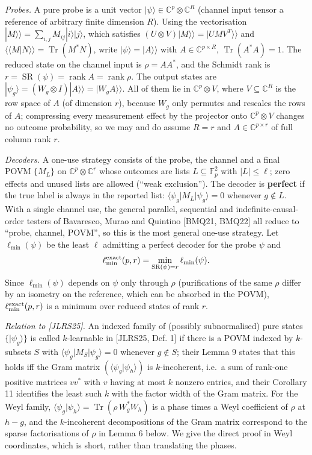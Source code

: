 \documentclass[
  11pt,
  a4paper,
]{article}
\begin{document}
\emph{Probes.} A pure probe is a unit vector
\(|\psi\rangle\in\mathbb C^p\otimes\mathbb C^R\) (channel input tensor a
reference of arbitrary finite dimension \(R\)). Using the vectorisation
\(|M\rangle\!\rangle=\sum_{i,\allowbreak{}j}M_{ij}|i\rangle|j\rangle\), which
satisfies \((U\otimes V)|M\rangle\!\rangle=|UMV^{T}\rangle\!\rangle\)
and \(\langle\!\langle M|N\rangle\!\rangle=\operatorname{Tr}(M^*N)\),
write \(|\psi\rangle=|A\rangle\!\rangle\) with
\(A\in\mathbb C^{p\times R}\), \(\operatorname{Tr}(A^*A)=1\). The
reduced state on the channel input is \(\rho=AA^*\), and the Schmidt
rank is
\(r=\operatorname{SR}(\psi)=\operatorname{rank}A=\operatorname{rank}\rho\).
The output states are
\(|\psi_g\rangle=(W_g\otimes I)|A\rangle\!\rangle=|W_gA\rangle\!\rangle\).
All of them lie in \(\mathbb C^p\otimes V\), where
\(V\subseteq\mathbb C^R\) is the row space of \(A\) (of dimension
\(r\)), because \(W_g\) only permutes and rescales the rows of \(A\);
compressing every measurement effect by the projector onto
\(\mathbb C^p\otimes V\) changes no outcome probability, so we may and
do assume \(R=r\) and \(A\in\mathbb C^{p\times r}\) of full column rank
\(r\).

\emph{Decoders.} A one-use strategy consists of the probe, the channel
and a final POVM \(\{M_L\}\) on \(\mathbb C^p\otimes\mathbb C^r\) whose
outcomes are lists \(L\subseteq\mathbb F_p^2\) with \(|L|\le\ell\); zero
effects and unused lists are allowed (``weak exclusion''). The decoder
is \textbf{perfect} if the true label is always in the reported list:
\(\langle\psi_g|M_L|\psi_g\rangle=0\) whenever \(g\notin L\). With a
single channel use, the general parallel, sequential and
indefinite-causal-order testers of Bavaresco, Murao and Quintino
{[}BMQ21, BMQ22{]} all reduce to ``probe, channel, POVM'', so this is
the most general one-use strategy. Let \(\ell_{\min}(\psi)\) be the
least \(\ell\) admitting a perfect decoder for the probe \(\psi\) and
\[\ell^{\rm exact}_{\min}(p,r)=\min_{\operatorname{SR}(\psi)=r}\ell_{\min}(\psi).\]
Since \(\ell_{\min}(\psi)\) depends on \(\psi\) only through \(\rho\)
(purifications of the same \(\rho\) differ by an isometry on the
reference, which can be absorbed in the POVM),
\(\ell^{\rm exact}_{\min}(p,\allowbreak{}r)\) is a minimum over reduced states of
rank \(r\).

\emph{Relation to {[}JLRS25{]}.} An indexed family of (possibly
subnormalised) pure states \(\{|\psi_g\rangle\}\) is called
\(k\)-learnable in {[}JLRS25, Def. 1{]} if there is a POVM indexed by
\(k\)-subsets \(S\) with \(\langle\psi_g|M_S|\psi_g\rangle=0\) whenever
\(g\notin S\); their Lemma 9 states that this holds iff the Gram matrix
\((\langle\psi_g|\psi_h\rangle)\) is \(k\)-incoherent, i.e.~a sum of
rank-one positive matrices \(vv^*\) with \(v\) having at most \(k\)
nonzero entries, and their Corollary 11 identifies the least such \(k\)
with the factor width of the Gram matrix. For the Weyl family,
\(\langle\psi_g|\psi_h\rangle=\operatorname{Tr}(\rho\,\allowbreak{}W_g^*W_h)\) is a
phase times a Weyl coefficient of \(\rho\) at \(h-g\), and the
\(k\)-incoherent decompositions of the Gram matrix correspond to the
sparse factorisations of \(\rho\) in Lemma 6 below. We give the direct
proof in Weyl coordinates, which is short, rather than translating the
phases.
\end{document}
